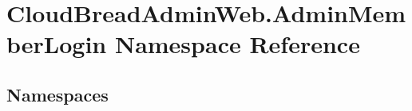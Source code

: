 \hypertarget{a00415}{}\section{Cloud\+Bread\+Admin\+Web.\+Admin\+Member\+Login Namespace Reference}
\label{a00415}
\subsection*{Namespaces}
\begin{DoxyCompactItemize}
\end{DoxyCompactItemize}
